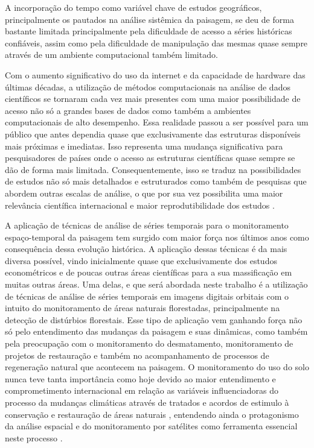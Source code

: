 \documentclass[12pt,a4paper]{article}
\begin{document}
A incorporação do tempo como variável chave de estudos geográficos, principalmente os pautados na análise sistêmica da paisagem, se deu de forma bastante limitada principalmente pela dificuldade de acesso a séries históricas confiáveis, assim como pela dificuldade de manipulação das mesmas quase sempre através de um ambiente computacional também limitado.

Com o aumento significativo do uso da internet e da capacidade de hardware das últimas décadas, a utilização de métodos computacionais na análise de dados científicos se tornaram cada vez mais presentes com uma maior possibilidade de acesso não só a grandes bases de dados como também a ambientes computacionais de alto desempenho. Essa realidade passou a ser possível para um público que antes dependia quase que exclusivamente das estruturas disponíveis mais próximas e imediatas. Isso representa uma mudança significativa para pesquisadores de países onde o acesso as estruturas científicas quase sempre se dão de forma mais limitada. Consequentemente, isso se traduz na possibilidades de estudos não só mais detalhados e estruturados como também de pesquisas que abordem outras escalas de análise, o que por sua vez possibilita uma maior relevância científica internacional e maior reprodutibilidade dos estudos \citep{ArribasBel2018}.

A aplicação de técnicas de análise de séries temporais para o monitoramento espaço-temporal da paisagem tem surgido com maior força nos últimos anos como consequência dessa evolução histórica. A aplicação dessas técnicas é da mais diversa possível, vindo inicialmente quase que exclusivamente dos estudos econométricos e de poucas outras áreas científicas para a sua massificação em muitas outras áreas. Uma delas, e que será abordada neste trabalho é a utilização de técnicas de análise de séries temporais em imagens digitais orbitais com o intuito do monitoramento de áreas naturais florestadas, principalmente na detecção de distúrbios florestais. Esse tipo de aplicação vem ganhando força não só pelo entendimento das mudanças da paisagem e suas dinâmicas, como também pela preocupação com o monitoramento do desmatamento, monitoramento de projetos de restauração e também no acompanhamento de processos de regeneração natural que acontecem na paisagem. O monitoramento do uso do solo nunca teve tanta importância como hoje devido ao maior entendimento e comprometimento internacional em relação as variáveis influenciadoras do processo da mudanças climáticas através de tratados e acordos de estimulo à conservação e restauração de áreas naturais \citep{ALMEIDA201934}, entendendo ainda o protagonismo da análise espacial e do monitoramento por satélites como ferramenta essencial neste processo \citep{WHITE2019}. 
\end{document}
